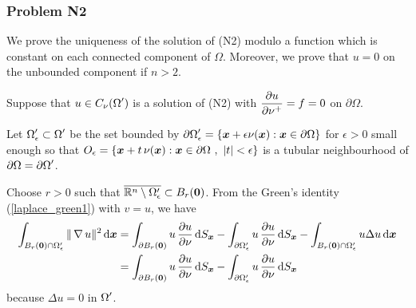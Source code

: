 \subsubsection{Problem N2}
We prove the uniqueness of the solution of (N2) modulo a
function which is constant on each connected component of $\Omega$.
Moreover, we prove that $u=0$ on the unbounded component if $n>2$.

Suppose that $\displaystyle u \in C_{\nu}(\Omega^{\prime})$ is a
solution of (N2) with $\displaystyle \frac{\partial{u}}{\partial \nu^+} = f = 0$ on
$\partial \Omega$.

Let $\displaystyle \Omega^{\prime}_\epsilon \subset \Omega^{\prime}$
be the set bounded by $\displaystyle \partial \Omega^{\prime}_\epsilon
= \{ {\bm{x}} + \epsilon \nu({\bm{x}}) : {\bm{x}}
\in \partial \Omega \}$ for $\epsilon>0$ small enough
so that
$\displaystyle
O_{\epsilon} = \left\{ {\bm{x}} + t\, \nu({\bm{x}}) : {\bm{x}} \in
  \partial \Omega \ , \ |t|<\epsilon \right\}$ is a tubular
neighbourhood of $\displaystyle \partial \Omega = \partial \Omega^{\prime}$.

Choose $r>0$ such that
$\displaystyle \overline{\mathbb{R}^n \setminus \Omega^{\prime}_\epsilon}
\subset B_r({\bm{0}})$.
From the Green's identity (\ref{laplace_green1}) with $v=u$, we have
\begin{align}
\int_{B_r({\bm{0}})\cap\Omega^{\prime}_\epsilon} \| \operatorname{\nabla} u \|^2 \,\mathrm{d}{{\bm{x}}} &=
\int_{\partial B_r({\bm{0}})} u\,\frac{\partial{u}}{\partial \nu} \,\mathrm{d}{S}_{{\bm{x}}}
- \int_{\partial \Omega^{\prime}_\epsilon} u\,\frac{\partial{u}}{\partial \nu} \,\mathrm{d}{S}_{{\bm{x}}}
- \int_{B_r({\bm{0}})\cap\Omega^{\prime}_\epsilon} u \Delta u \,\mathrm{d}{{\bm{x}}}
\nonumber \\
&= \int_{\partial B_r({\bm{0}})} u\,\frac{\partial{u}}{\partial \nu} \,\mathrm{d}{S}_{{\bm{x}}}
- \int_{\partial \Omega^{\prime}_\epsilon} u\,\frac{\partial{u}}{\partial \nu} \,\mathrm{d}{S}_{{\bm{x}}}
\label{potN2Eq1}
\end{align}
because $\Delta u =0$ in $\displaystyle \Omega^{\prime}$.

